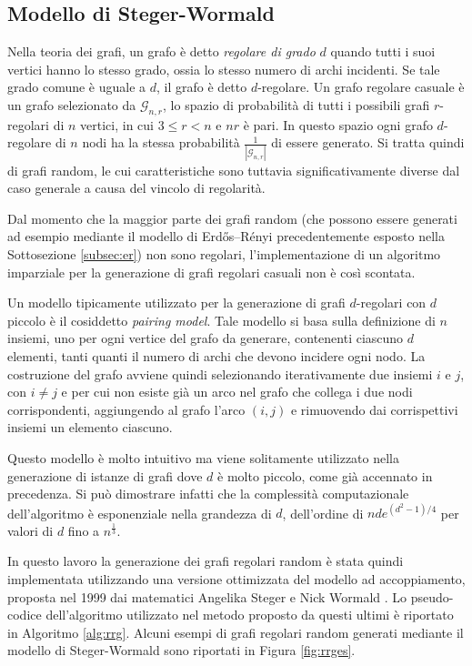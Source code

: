 \subsection{Modello di Steger-Wormald}
\label{subsec:steger}
Nella teoria dei grafi, un grafo è detto \textit{regolare di grado} $d$ quando tutti i suoi vertici hanno lo stesso grado, ossia lo stesso numero di archi incidenti. Se tale grado comune è uguale a $d$, il grafo è detto $d$-regolare. Un grafo regolare casuale è un grafo selezionato da $\mathcal{G}_{n,r}$, lo spazio di probabilità di tutti i possibili grafi $r$-regolari di $n$ vertici, in cui $3\leq r < n$ e $nr$ è pari. In questo spazio ogni grafo $d$-regolare di $n$ nodi ha la stessa probabilità $\frac{1}{|\mathcal{G}_{n,r}|}$ di essere generato. Si tratta quindi di grafi random, le cui caratteristiche sono tuttavia significativamente diverse dal caso generale a causa del vincolo di regolarità.

Dal momento che la maggior parte dei grafi random (che possono essere generati ad esempio mediante il modello di Erdős–Rényi precedentemente esposto nella Sottosezione \ref{subsec:er}) non sono regolari, l'implementazione di un algoritmo imparziale per la generazione di grafi regolari casuali non è così scontata. 

Un modello tipicamente utilizzato per la generazione di grafi $d$-regolari con $d$ piccolo è il cosiddetto \textit{pairing model}. Tale modello si basa sulla definizione di $n$ insiemi, uno per ogni vertice del grafo da generare, contenenti ciascuno $d$ elementi, tanti quanti il numero di archi che devono incidere ogni nodo. La costruzione del grafo avviene quindi selezionando iterativamente due insiemi $i$ e $j$, con $i \neq j$ e per cui non esiste già un arco nel grafo che collega i due nodi corrispondenti, aggiungendo al grafo l'arco $(i,j)$ e rimuovendo dai corrispettivi insiemi un elemento ciascuno. 

Questo modello è molto intuitivo ma viene solitamente utilizzato nella generazione di istanze di grafi dove $d$ è molto piccolo, come già accennato in precedenza. Si può dimostrare infatti che la complessità computazionale dell'algoritmo è esponenziale nella grandezza di $d$, dell'ordine di $nde^{(d^2-1)/4}$ \cite{steger_wormald_1999} per valori di $d$ fino a $n^{\frac{1}{3}}$.

In questo lavoro la generazione dei grafi regolari random è stata quindi implementata utilizzando una versione ottimizzata del modello ad accoppiamento, proposta nel 1999 dai matematici Angelika Steger e Nick Wormald \cite{steger_wormald_1999}. Lo pseudo-codice dell'algoritmo utilizzato nel metodo proposto da questi ultimi è riportato in Algoritmo \ref{alg:rrg}. Alcuni esempi di grafi regolari random generati mediante il modello di Steger-Wormald sono riportati in Figura \ref{fig:rrges}.


